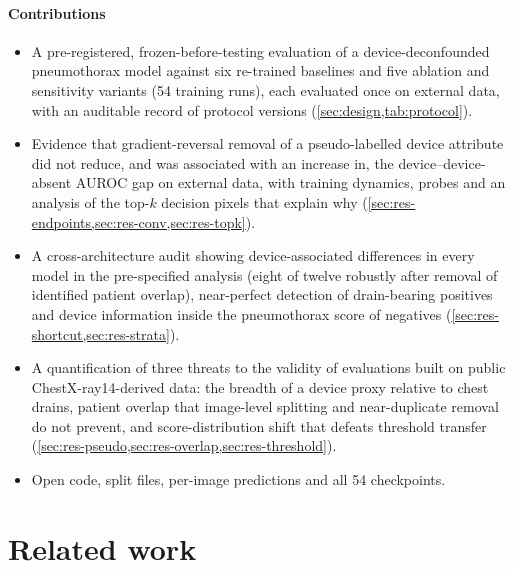 \documentclass{ieeeaccess}
\begin{document}
\paragraph{Contributions}
\begin{itemize}
  \item A pre-registered, frozen-before-testing evaluation of a device-deconfounded pneumothorax model against six re-trained baselines and five ablation and sensitivity variants (54 training runs), each evaluated once on external data, with an auditable record of protocol versions (\cref{sec:design,tab:protocol}).
  \item Evidence that gradient-reversal removal of a pseudo-labelled device attribute did not reduce, and was associated with an increase in, the device--device-absent AUROC gap on external data, with training dynamics, probes and an analysis of the top-$k$ decision pixels that explain why (\cref{sec:res-endpoints,sec:res-conv,sec:res-topk}).
  \item A cross-architecture audit showing device-associated differences in every model in the pre-specified analysis (eight of twelve robustly after removal of identified patient overlap), near-perfect detection of drain-bearing positives and device information inside the pneumothorax score of negatives (\cref{sec:res-shortcut,sec:res-strata}).
  \item A quantification of three threats to the validity of evaluations built on public ChestX-ray14-derived data: the breadth of a device proxy relative to chest drains, patient overlap that image-level splitting and near-duplicate removal do not prevent, and score-distribution shift that defeats threshold transfer (\cref{sec:res-pseudo,sec:res-overlap,sec:res-threshold}).
  \item Open code, split files, per-image predictions and all 54 checkpoints.
\end{itemize}

\section{Related work}
\label{sec:related}
\end{document}
